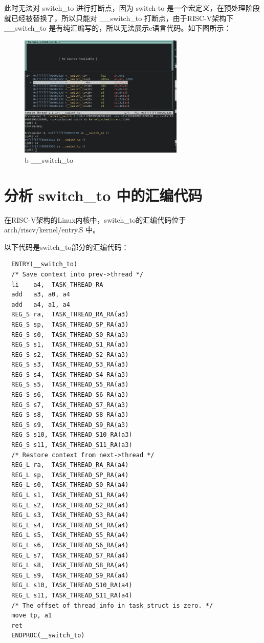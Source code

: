 \documentclass[lang=cn,10pt]{elegantbook}
\begin{document}
此时无法对 switch\_to  进行打断点，因为 switch-to 是一个宏定义，在预处理阶段就已经被替换了，所以只能对 \_\_switch\_to 打断点，由于RISC-V架构下 \_\_switch\_to 是有纯汇编写的，所以无法展示c语言代码。如下图所示：
\begin{figure}[htbp]
  \centering
  \includegraphics[width=0.7\textwidth]{image/image-20231109204506752.png}
  \caption{b \_\_switch\_to}
\end{figure}


\section{分析 switch\_to 中的汇编代码}
在RISC-V架构的Linux内核中，switch\_to的汇编代码位于 arch/riscv/kernel/entry.S 中。

以下代码是switch\_to部分的汇编代码：

\begin{lstlisting}
  ENTRY(__switch_to)
  /* Save context into prev->thread */
  li    a4,  TASK_THREAD_RA
  add   a3, a0, a4
  add   a4, a1, a4
  REG_S ra,  TASK_THREAD_RA_RA(a3)
  REG_S sp,  TASK_THREAD_SP_RA(a3)
  REG_S s0,  TASK_THREAD_S0_RA(a3)
  REG_S s1,  TASK_THREAD_S1_RA(a3)
  REG_S s2,  TASK_THREAD_S2_RA(a3)
  REG_S s3,  TASK_THREAD_S3_RA(a3)
  REG_S s4,  TASK_THREAD_S4_RA(a3)
  REG_S s5,  TASK_THREAD_S5_RA(a3)
  REG_S s6,  TASK_THREAD_S6_RA(a3)
  REG_S s7,  TASK_THREAD_S7_RA(a3)
  REG_S s8,  TASK_THREAD_S8_RA(a3)
  REG_S s9,  TASK_THREAD_S9_RA(a3)
  REG_S s10, TASK_THREAD_S10_RA(a3)
  REG_S s11, TASK_THREAD_S11_RA(a3)
  /* Restore context from next->thread */
  REG_L ra,  TASK_THREAD_RA_RA(a4)
  REG_L sp,  TASK_THREAD_SP_RA(a4)
  REG_L s0,  TASK_THREAD_S0_RA(a4)
  REG_L s1,  TASK_THREAD_S1_RA(a4)
  REG_L s2,  TASK_THREAD_S2_RA(a4)
  REG_L s3,  TASK_THREAD_S3_RA(a4)
  REG_L s4,  TASK_THREAD_S4_RA(a4)
  REG_L s5,  TASK_THREAD_S5_RA(a4)
  REG_L s6,  TASK_THREAD_S6_RA(a4)
  REG_L s7,  TASK_THREAD_S7_RA(a4)
  REG_L s8,  TASK_THREAD_S8_RA(a4)
  REG_L s9,  TASK_THREAD_S9_RA(a4)
  REG_L s10, TASK_THREAD_S10_RA(a4)
  REG_L s11, TASK_THREAD_S11_RA(a4)
  /* The offset of thread_info in task_struct is zero. */
  move tp, a1
  ret
  ENDPROC(__switch_to)
\end{lstlisting}
\end{document}
